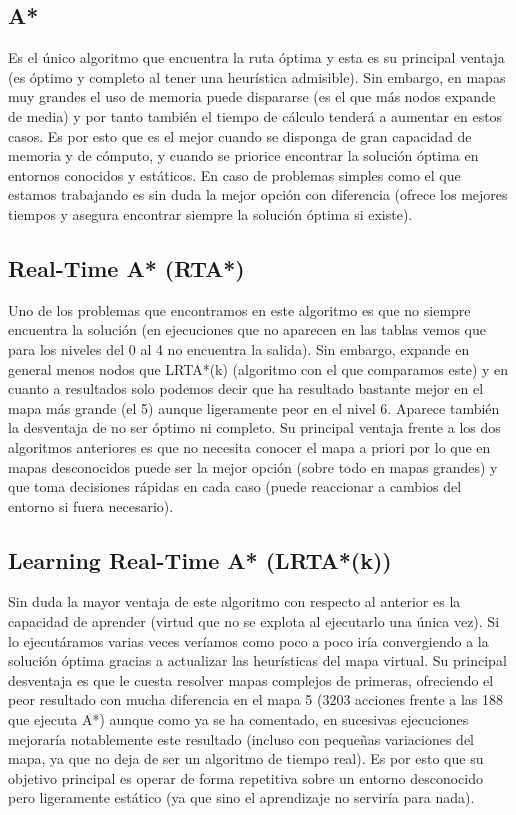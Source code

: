 \documentclass[11pt]{article}
\begin{document}
\subsection{A*}
Es el único algoritmo que encuentra la ruta óptima y esta es su principal ventaja (es óptimo y completo al tener una heurística admisible). Sin embargo, en mapas muy grandes el uso de memoria puede dispararse (es el que más nodos expande de media) y por tanto también el tiempo de cálculo tenderá a aumentar en estos casos. Es por esto que es el mejor cuando se disponga de gran capacidad de memoria y de cómputo, y cuando se priorice encontrar la solución óptima en entornos conocidos y estáticos. En caso de problemas simples como el que estamos trabajando es sin duda la mejor opción con diferencia (ofrece los mejores tiempos y asegura encontrar siempre la solución óptima si existe).

\subsection{Real-Time A* (RTA*)}
Uno de los problemas que encontramos en este algoritmo es que no siempre encuentra la solución (en ejecuciones que no aparecen en las tablas vemos que para los niveles del 0 al 4 no encuentra la salida). Sin embargo, expande en general menos nodos que LRTA*(k) (algoritmo con el que comparamos este) y en cuanto a resultados solo podemos decir que ha resultado bastante mejor en el mapa más grande (el 5) aunque ligeramente peor en el nivel 6. Aparece también la desventaja de no ser óptimo ni completo. Su principal ventaja frente a los dos algoritmos anteriores es que no necesita conocer el mapa a priori por lo que en mapas desconocidos puede ser la mejor opción (sobre todo en mapas grandes) y que toma decisiones rápidas en cada caso (puede reaccionar a cambios del entorno si fuera necesario).

\subsection{Learning Real-Time A* (LRTA*(k))}
Sin duda la mayor ventaja de este algoritmo con respecto al anterior es la capacidad de aprender (virtud que no se explota al ejecutarlo una única vez). Si lo ejecutáramos varias veces veríamos como poco a poco iría convergiendo a la solución óptima gracias a actualizar las heurísticas del mapa virtual. Su principal desventaja es que le cuesta resolver mapas complejos de primeras, ofreciendo el peor resultado con mucha diferencia en el mapa 5 (3203 acciones frente a las 188 que ejecuta A*) aunque como ya se ha comentado, en sucesivas ejecuciones mejoraría notablemente este resultado (incluso con pequeñas variaciones del mapa, ya que no deja de ser un algoritmo de tiempo real). Es por esto que su objetivo principal es operar de forma repetitiva sobre un entorno desconocido pero ligeramente estático (ya que sino el aprendizaje no serviría para nada).
\end{document}
